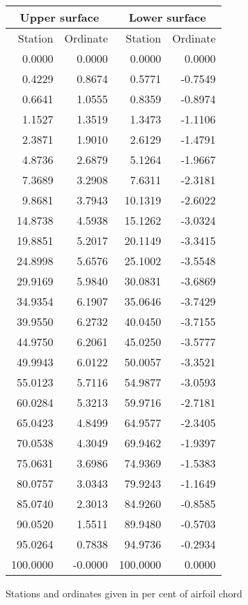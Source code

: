 \documentclass[11pt]{book}
\begin{document}
 \hspace{4mm}
 \begin{tabular}{|r|r|r|r|} \hline 
 \multicolumn{2}{|c|}{Upper surface} & \multicolumn{2}{|c|}{Lower surface} \\
 \hline
 Station & Ordinate & Station & Ordinate \\
 \hline
0.0000 & 0.0000 & 0.0000 & 0.0000 \\
0.4229 & 0.8674 & 0.5771 & -0.7549 \\
0.6641 & 1.0555 & 0.8359 & -0.8974 \\
1.1527 & 1.3519 & 1.3473 & -1.1106 \\
2.3871 & 1.9010 & 2.6129 & -1.4791 \\
4.8736 & 2.6879 & 5.1264 & -1.9667 \\
7.3689 & 3.2908 & 7.6311 & -2.3181 \\
9.8681 & 3.7943 & 10.1319 & -2.6022 \\
14.8738 & 4.5938 & 15.1262 & -3.0324 \\
19.8851 & 5.2017 & 20.1149 & -3.3415 \\
24.8998 & 5.6576 & 25.1002 & -3.5548 \\
29.9169 & 5.9840 & 30.0831 & -3.6869 \\
34.9354 & 6.1907 & 35.0646 & -3.7429 \\
39.9550 & 6.2732 & 40.0450 & -3.7155 \\
44.9750 & 6.2061 & 45.0250 & -3.5777 \\
49.9943 & 6.0122 & 50.0057 & -3.3521 \\
55.0123 & 5.7116 & 54.9877 & -3.0593 \\
60.0284 & 5.3213 & 59.9716 & -2.7181 \\
65.0423 & 4.8499 & 64.9577 & -2.3405 \\
70.0538 & 4.3049 & 69.9462 & -1.9397 \\
75.0631 & 3.6986 & 74.9369 & -1.5383 \\
80.0757 & 3.0343 & 79.9243 & -1.1649 \\
85.0740 & 2.3013 & 84.9260 & -0.8585 \\
90.0520 & 1.5511 & 89.9480 & -0.5703 \\
95.0264 & 0.7838 & 94.9736 & -0.2934 \\
100.0000 & -0.0000 & 100.0000 & 0.0000 \\
 \hline 
 \end{tabular}
 \vspace{8mm}

Stations and ordinates given in per cent of airfoil chord
\end{document}

